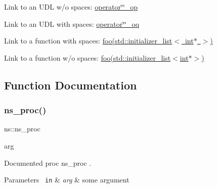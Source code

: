 \begin{DoxyCode}{0}
\end{DoxyCode}



\begin{DoxyItemize}
\item Link to an U\+DL w/o spaces\+: \mbox{\hyperlink{namespacens_afd2e8a8437eff630f52a452ea6dc6e82}{operator\char`\"{}\char`\"{}\+\_\+op}}
\item Link to an U\+DL with spaces\+: \mbox{\hyperlink{namespacens_a47f70e51e66b81b8383a4e2da66f1e09}{operator\char`\"{}\char`\"{}\+\_\+oq}}
\item Link to a function with spaces\+: \mbox{\hyperlink{namespacens_aaa9eb8a7b40d4ed0edbe5e163b4e6e8d}{foo(std\+::initializer\+\_\+list$<$ int$\ast$ $>$)}}
\item Link to a function w/o spaces\+: \mbox{\hyperlink{namespacens_aaa9eb8a7b40d4ed0edbe5e163b4e6e8d}{foo(std\+::initializer\+\_\+list$<$int$\ast$$>$)}} 
\end{DoxyItemize}

\subsection{Function Documentation}
\mbox{\label{namespacens_a1429cbe84d32b17ea4783e5c5c00615b}} 
\subsubsection{\texorpdfstring{ns\_proc()}{ns\_proc()}}
{\footnotesize\ttfamily ns\+::ns\+\_\+proc\begin{DoxyParamCaption}\item[{}]{arg  }\end{DoxyParamCaption}}

Documented proc {\ttfamily ns\+\_\+proc} . 
\begin{DoxyParams}[1]{Parameters}
\mbox{\texttt{ in}}  & {\em arg} & some argument \\
\hline
\end{DoxyParams}
